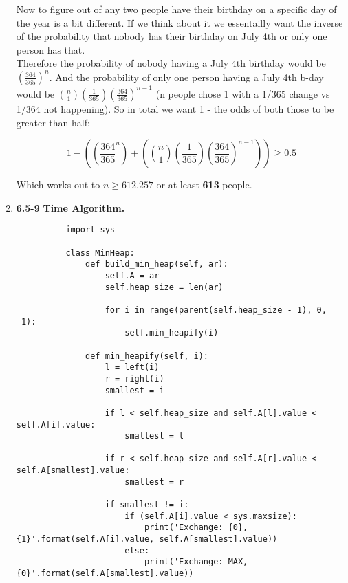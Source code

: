 \documentclass{article}
\begin{document}
\begin{enumerate}
        Now to figure out of any two people have their birthday on a specific day of the year is a bit different. 
        If we think about it we essentailly want the inverse of the probability that nobody has their birthday on July 4th or only one person has that.\\

        Therefore the probability of nobody having a July 4th birthday would be $(\frac{364}{365})^n$. 
        And the probability of only one person having a July 4th b-day would be $\binom{n}{1}(\frac{1}{365})(\frac{364}{365})^{n-1}$ (n people chose 1 with a 1/365 change vs 1/364 not happening).
        So in total we want 1 - the odds of both those to be greater than half:

        \[1 - ((\frac{364}{365}^n)+(\binom{n}{1}(\frac{1}{365})(\frac{364}{365})^{n-1})) \geq 0.5\]

        Which works out to $n \geq 612.257$ or at least \textbf{613} people. 

        \item \textbf{6.5-9}  \textbf{Time Algorithm.}

        \begin{lstlisting}
          import sys

          class MinHeap: 
              def build_min_heap(self, ar): 
                  self.A = ar
                  self.heap_size = len(ar)
                  
                  for i in range(parent(self.heap_size - 1), 0, -1):
                      self.min_heapify(i)

              def min_heapify(self, i): 
                  l = left(i) 
                  r = right(i)        
                  smallest = i 
                  
                  if l < self.heap_size and self.A[l].value < self.A[i].value: 
                      smallest = l 
                  
                  if r < self.heap_size and self.A[r].value < self.A[smallest].value: 
                      smallest = r 
                  
                  if smallest != i: 
                      if (self.A[i].value < sys.maxsize):
                          print('Exchange: {0}, {1}'.format(self.A[i].value, self.A[smallest].value))
                      else:
                          print('Exchange: MAX, {0}'.format(self.A[smallest].value))
                          

\end{lstlisting}
\end{enumerate}
\end{document}
